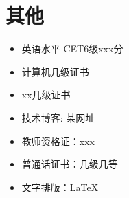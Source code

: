 \documentclass[11pt]{article}
\begin{document}
    
    \section{\makebox[\widthof{\faInfo}][c]{\color{NPU_Blue}{\faInfo}}\quad 其他}
    \vspace{0.5em}          %
    \begin{itemize}
        \item 英语水平-CET6级xxx分
        \item 计算机几级证书
        \item xx几级证书
        \item 技术博客: 某网址
        \item 教师资格证：xxx
        \item 普通话证书：几级几等
        \item 文字排版：\LaTeX
    \end{itemize}
\end{document}
